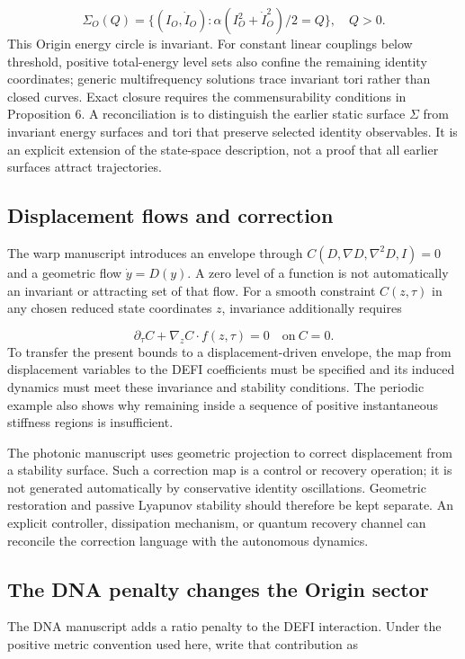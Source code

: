 \documentclass[aip,adv,preprint,floatfix]{revtex4-2}
\begin{document}
\begin{equation}
\Sigma_O(Q)=\{(I_O,\dot I_O):\alpha(I_O^2+\dot I_O^2)/2=Q\},\quad Q>0.
\end{equation}
This Origin energy circle is invariant. For constant linear couplings below threshold, positive total-energy level sets also confine the remaining identity coordinates; generic multifrequency solutions trace invariant tori rather than closed curves. Exact closure requires the commensurability conditions in Proposition 6. A reconciliation is to distinguish the earlier static surface $\Sigma$ from invariant energy surfaces and tori that preserve selected identity observables. It is an explicit extension of the state-space description, not a proof that all earlier surfaces attract trajectories.

\subsection*{Displacement flows and correction}
The warp manuscript \cite{r4} introduces an envelope through $C(D,\nabla D,\nabla^2D,I)=0$ and a geometric flow $\dot y=D(y)$. A zero level of a function is not automatically an invariant or attracting set of that flow. For a smooth constraint $C(z,\tau)$ in any chosen reduced state coordinates $z$, invariance additionally requires

\begin{equation}
\partial_\tau C+\nabla_zC\cdot f(z,\tau)=0\quad\mathrm{on}\ C=0.
\end{equation}
To transfer the present bounds to a displacement-driven envelope, the map from displacement variables to the DEFI coefficients must be specified and its induced dynamics must meet these invariance and stability conditions. The periodic example also shows why remaining inside a sequence of positive instantaneous stiffness regions is insufficient.

The photonic manuscript \cite{r5} uses geometric projection to correct displacement from a stability surface. Such a correction map is a control or recovery operation; it is not generated automatically by conservative identity oscillations. Geometric restoration and passive Lyapunov stability should therefore be kept separate. An explicit controller, dissipation mechanism, or quantum recovery channel can reconcile the correction language with the autonomous dynamics.

\subsection*{The DNA penalty changes the Origin sector}
The DNA manuscript \cite{r7} adds a ratio penalty to the DEFI interaction. Under the positive metric convention used here, write that contribution as
\end{document}
